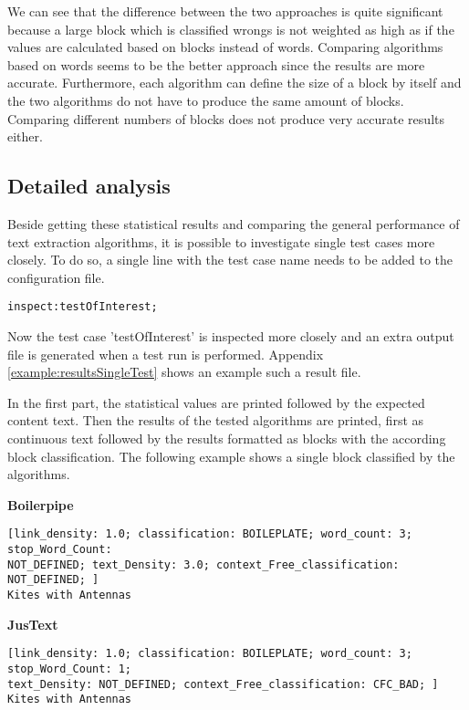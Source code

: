 We can see that the difference between the two approaches is quite significant because a large block which is classified wrongs is not weighted as high as if the values are calculated based on blocks instead of words. 
Comparing algorithms based on words seems to be the better approach since the results are more accurate. Furthermore, each algorithm can define the size of a block by itself and the two algorithms do not have to produce the same amount of blocks. Comparing different numbers of blocks does not produce very accurate results either.

\subsection{Detailed analysis}
\label{subsec:Detailed Analysis}

Beside getting these statistical results and comparing the general performance of text extraction algorithms, it is possible to investigate single test cases more closely. To do so, a single line with the test case name needs to be added to the configuration file.

\begin{lstlisting}
inspect:testOfInterest;
\end{lstlisting}

Now the test case 'testOfInterest' is inspected more closely and an extra output file is generated when a test run is performed. Appendix \ref{example:resultsSingleTest} shows an example such a result file.

In the first part, the statistical values are printed followed by the expected content text. Then the results of the tested algorithms are printed, first as continuous text followed by the results formatted as blocks with the according block classification.
The following example shows a single block classified by the algorithms.


\textbf{Boilerpipe}
\begin{lstlisting}
[link_density: 1.0; classification: BOILEPLATE; word_count: 3; stop_Word_Count: 
NOT_DEFINED; text_Density: 3.0; context_Free_classification: NOT_DEFINED; ]
Kites with Antennas
\end{lstlisting}


\textbf{JusText}
\begin{lstlisting}
[link_density: 1.0; classification: BOILEPLATE; word_count: 3; stop_Word_Count: 1; 
text_Density: NOT_DEFINED; context_Free_classification: CFC_BAD; ] 
Kites with Antennas
\end{lstlisting}


